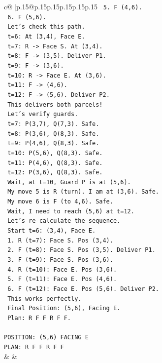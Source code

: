 \documentclass{article}
\begin{document}
{\begin{supertabular}{c@{$\;$}|p{.15\linewidth}@{}p{.15\linewidth}p{.15\linewidth}p{.15\linewidth}p{.15\linewidth}p{.15\linewidth}}
{{{\texttt{   5. F (4,6).} \\
\texttt{   6. F (5,6).} \\
\texttt{   Let's check this path.} \\
\texttt{   t=6: At (3,4), Face E.} \\
\texttt{   t=7: R {-}> Face S. At (3,4).} \\
\texttt{   t=8: F {-}> (3,5). Deliver P1.} \\
\texttt{   t=9: F {-}> (3,6).} \\
\texttt{   t=10: R {-}> Face E. At (3,6).} \\
\texttt{   t=11: F {-}> (4,6).} \\
\texttt{   t=12: F {-}> (5,6). Deliver P2.} \\
\texttt{   This delivers both parcels!} \\
\texttt{   Let's verify guards.} \\
\texttt{   t=7: P(3,7), Q(7,3). Safe.} \\
\texttt{   t=8: P(3,6), Q(8,3). Safe.} \\
\texttt{   t=9: P(4,6), Q(8,3). Safe.} \\
\texttt{   t=10: P(5,6), Q(8,3). Safe.} \\
\texttt{   t=11: P(4,6), Q(8,3). Safe.} \\
\texttt{   t=12: P(3,6), Q(8,3). Safe.} \\
\texttt{   Wait, at t=10, Guard P is at (5,6).} \\
\texttt{   My move 5 is R (turn). I am at (3,6). Safe.} \\
\texttt{   My move 6 is F (to 4,6). Safe.} \\
\texttt{   Wait, I need to reach (5,6) at t=12.} \\
\texttt{   Let's re{-}calculate the sequence.} \\
\texttt{   Start t=6: (3,4), Face E.} \\
\texttt{   1. R (t=7): Face S. Pos (3,4).} \\
\texttt{   2. F (t=8): Face S. Pos (3,5). Deliver P1.} \\
\texttt{   3. F (t=9): Face S. Pos (3,6).} \\
\texttt{   4. R (t=10): Face E. Pos (3,6).} \\
\texttt{   5. F (t=11): Face E. Pos (4,6).} \\
\texttt{   6. F (t=12): Face E. Pos (5,6). Deliver P2.} \\
\texttt{   This works perfectly.} \\
\texttt{   Final Position: (5,6), Facing E.} \\
\texttt{   Plan: R F F R F F.} \\
\\ 
\texttt{POSITION: (5,6) FACING E} \\
\texttt{PLAN: R F F R F F} \\
            }
        }
    }
    & & \\ \\


\end{supertabular}}
\end{document}
